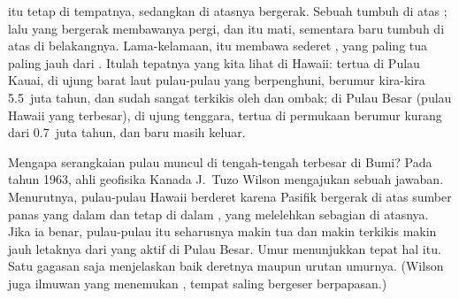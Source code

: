  itu tetap di tempatnya, sedangkan  di atasnya bergerak.
Sebuah  tumbuh di atas ; lalu  yang bergerak
membawanya pergi, dan  itu mati, sementara  baru tumbuh
di atas  di belakangnya. Lama-kelamaan,  itu membawa
sederet , yang paling tua paling jauh dari . Itulah
tepatnya yang kita lihat di Hawaii:  tertua di Pulau Kauai, di ujung
barat laut pulau-pulau yang berpenghuni, berumur kira-kira 5.5~juta tahun,
dan sudah sangat terkikis oleh  dan ombak; di Pulau Besar (pulau
Hawaii yang terbesar), di ujung tenggara,  tertua di permukaan berumur kurang dari
0.7~juta tahun, dan  baru masih keluar.

\begin{history}
Mengapa serangkaian pulau  muncul di tengah-tengah 
terbesar di Bumi? Pada tahun 1963, ahli geofisika Kanada J.~Tuzo Wilson
mengajukan sebuah jawaban. Menurutnya, pulau-pulau Hawaii berderet karena
 Pasifik bergerak di atas sumber panas yang dalam dan tetap di
dalam , yang melelehkan sebagian  di atasnya. Jika ia benar,
pulau-pulau itu seharusnya makin tua dan makin terkikis makin jauh letaknya
dari  yang aktif di Pulau Besar. Umur 
menunjukkan tepat hal itu. Satu gagasan saja menjelaskan baik deretnya maupun urutan umurnya.
(Wilson juga ilmuwan yang menemukan , tempat 
saling bergeser berpapasan.)
\end{history}

